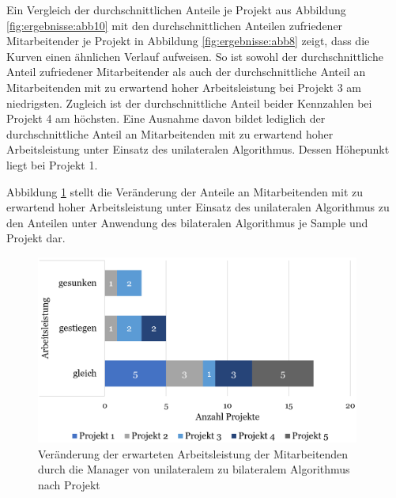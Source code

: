 Ein Vergleich der durchschnittlichen Anteile je Projekt aus Abbildung \ref{fig:ergebnisse:abb10} mit den durchschnittlichen Anteilen zufriedener Mitarbeitender je Projekt in Abbildung \ref{fig:ergebnisse:abb8} zeigt, dass die Kurven einen ähnlichen Verlauf aufweisen.
So ist sowohl der durchschnittliche Anteil zufriedener Mitarbeitender als auch der durchschnittliche Anteil an Mitarbeitenden mit zu erwartend hoher Arbeitsleistung bei Projekt 3 am niedrigsten.
Zugleich ist der durchschnittliche Anteil beider Kennzahlen bei Projekt 4 am höchsten.
Eine Ausnahme davon bildet lediglich der durchschnittliche Anteil an Mitarbeitenden mit zu erwartend hoher Arbeitsleistung unter Einsatz des unilateralen Algorithmus.
Dessen Höhepunkt liegt bei Projekt 1.

Abbildung \ref{fig:ergebnisse:abb11} stellt die Veränderung der Anteile an Mitarbeitenden mit zu erwartend hoher Arbeitsleistung unter Einsatz des unilateralen Algorithmus zu den Anteilen unter Anwendung des bilateralen Algorithmus je Sample und Projekt dar.

\begin{figure}[H]
    \centering
	\includegraphics[width=0.95\textwidth]{gfx/verhaeltnis-a-projekte.png}
	\caption[Veränderung der erwarteten Arbeitsleistung der Mitarbeitenden durch die Manager von unilateralem zu bilateralem Algorithmus nach Projekt]{Veränderung der erwarteten Arbeitsleistung der Mitarbeitenden durch die Manager von unilateralem zu bilateralem Algorithmus nach Projekt}
	\label{fig:ergebnisse:abb11}
\end{figure}

